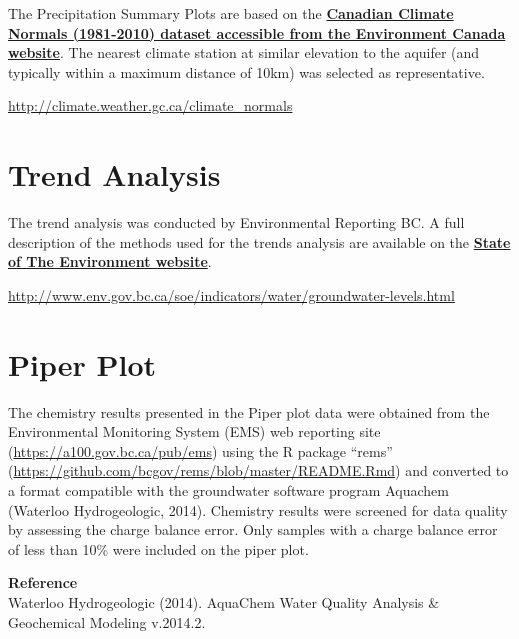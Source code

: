 \documentclass[11pt,]{article}
\let\oldhref\href
\renewcommand{\href}[2]{\oldhref{#1}{\bfseries#2}}
\begin{document}
The Precipitation Summary Plots are based on the
\href{http://climate.weather.gc.ca/climate_normals}{Canadian Climate
Normals (1981-2010) dataset accessible from the Environment Canada
website}. The nearest climate station at similar elevation to the
aquifer (and typically within a maximum distance of 10km) was selected
as representative.

\url{http://climate.weather.gc.ca/climate_normals}

\section{Trend Analysis}\label{trend-analysis}

The trend analysis was conducted by Environmental Reporting BC. A full
description of the methods used for the trends analysis are available on
the
\href{http://www.env.gov.bc.ca/soe/indicators/water/groundwater-levels.html}{State
of The Environment website}.

\url{http://www.env.gov.bc.ca/soe/indicators/water/groundwater-levels.html}

\section{Piper Plot}\label{piper-plot}

The chemistry results presented in the Piper plot data were obtained
from the Environmental Monitoring System (EMS) web reporting site
(\url{https://a100.gov.bc.ca/pub/ems}) using the R package ``rems''
(\url{https://github.com/bcgov/rems/blob/master/README.Rmd}) and
converted to a format compatible with the groundwater software program
Aquachem (Waterloo Hydrogeologic, 2014). Chemistry results were screened
for data quality by assessing the charge balance error. Only samples
with a charge balance error of less than 10\% were included on the piper
plot.

\textbf{Reference}\\
Waterloo Hydrogeologic (2014). AquaChem Water Quality Analysis \&
Geochemical Modeling v.2014.2.
\end{document}
